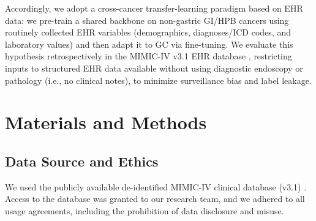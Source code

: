 \documentclass[diagnostics,article,submit,pdftex,moreauthors]{Definitions/mdpi}
\begin{document}
Accordingly, we adopt a cross-cancer transfer-learning paradigm based on EHR data: we pre-train a shared backbone on non-gastric GI/HPB cancers using routinely collected EHR variables (demographics, diagnoses/ICD codes, and laboratory values) and then adapt it to GC via fine-tuning. We evaluate this hypothesis retrospectively in the MIMIC-IV v3.1 EHR database \citep{Johnson2024MIMICIV}, restricting inputs to structured EHR data available without using diagnostic endoscopy or pathology (i.e., no clinical notes), to minimize surveillance bias and label leakage.




\section{Materials and Methods}

\subsection{Data Source and Ethics}
We used the publicly available de-identified MIMIC-IV clinical database (v3.1) \citep{Johnson2024MIMICIV}.
Access to the database was granted to our research team, and we adhered to all usage agreements, including the prohibition of data disclosure and misuse.
\end{document}

